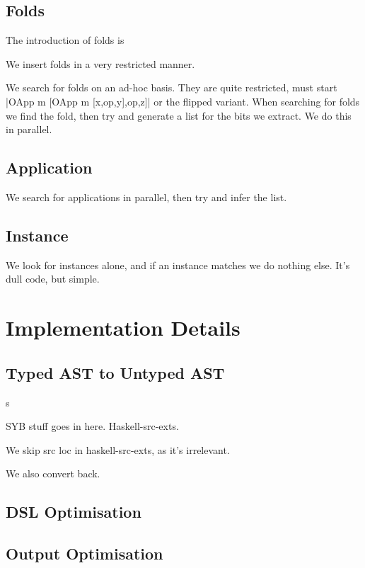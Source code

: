 \documentclass[preprint,draft]{sigplanconf}
\begin{document}
\subsection{Folds}

The introduction of folds is 

We insert folds in a very restricted manner. 

We search for folds on an ad-hoc basis. They are quite restricted, must start |OApp m [OApp m [x,op,y],op,z]| or the flipped variant. When searching for folds we find the fold, then try and generate a list for the bits we extract. We do this in parallel.

\subsection{Application}

We search for applications in parallel, then try and infer the list.

\subsection{Instance}

We look for instances alone, and if an instance matches we do nothing else. It's dull code, but simple.



\section{Implementation Details}
\label{sec:implementation}

\subsection{Typed AST to Untyped AST}s
\label{sec:universe}

SYB stuff goes in here. Haskell-src-exts.

We skip src loc in haskell-src-exts, as it's irrelevant.

We also convert back.

\subsection{DSL Optimisation}

\subsection{Output Optimisation}
\label{sec:simplify}
\end{document}
